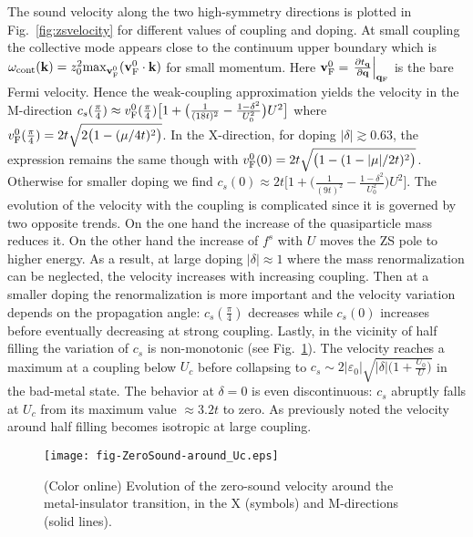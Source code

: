 \documentclass[showpacs,amsmath,twocolumn,floatfix]{revtex4-1}
\begin{document}
The sound velocity along the two high-symmetry directions is plotted in 
Fig.~\ref{fig:zsvelocity} for different values of coupling and doping. At small 
coupling the collective mode appears close to the continuum upper boundary which 
is $\omega_{\rm cont}({\bf k}) = z_0^2 {\rm max}_{{\bf v}_{\rm F}^0} 
({\bf v}_{\rm F}^0 \cdot {\bf k}) $ for small momentum. Here 
${\bf v}_{\rm F}^0 = \left.  \frac{ \partial t_{\bf q}}{ \partial {\bf q}} 
\right|_{{\bf q}_{\rm F}}$ is the bare Fermi velocity. Hence the weak-coupling 
approximation yields the velocity in the M-direction  
 $c_s(\frac{\pi}{4}) \approx v_{\rm F}^0 (\frac{\pi}{4}) \big[1+ \big(\frac{1}{(18 t)^2} 
 - \frac{1-\delta^2}{U_0^2}\big)U^2 \big]$
where $ v_{\rm F}^0 (\frac{\pi}{4}) = 2t\sqrt{2\big(1-({\mu}/{4t})^2\big)}$. In the 
X-direction, for doping $|\delta| \gtrsim 0.63$, the expression remains the same though 
with $v_{\rm F}^0(0) = 2t \sqrt{\big(1-(1-{|\mu|}/{2t})^2\big)}$. Otherwise for smaller 
doping we find $c_s(0) \approx 2 t \big[1+ \big(\frac{1}{(9t)^2} - \frac{1-\delta^2}{U_0^2}
\big)U^2 \big]$. The evolution of the velocity with the coupling is complicated since it 
is governed by two opposite trends. On the one hand the increase of the quasiparticle mass 
reduces it. On the other hand the increase of $f^s$ with $U$ moves the ZS pole to higher 
energy. As a result, at large doping $|\delta| \approx 1$ where the mass renormalization 
can be neglected, the velocity increases with increasing coupling. Then at a smaller 
doping the renormalization is more important and the velocity variation depends on the 
propagation angle: $c_s(\frac{\pi}{4})$ decreases while $c_s(0)$ increases before 
eventually decreasing at strong coupling. Lastly, in the vicinity of half filling the 
variation of $c_s$ is non-monotonic (see Fig.~\ref{fig:zsvelocity-2}). The velocity 
reaches a maximum at a coupling below $U_c$ before collapsing to 
$c_s \sim 2 |\varepsilon_0|\sqrt{|\delta|\big(1+\frac{U_0}{U}\big)}$ in the bad-metal 
state. The behavior at $\delta=0$ is even discontinuous: $c_s$ abruptly falls at $U_c$ 
from its maximum value $\approx 3.2t$ to zero. As previously noted the velocity around 
half filling becomes isotropic at large coupling. 


\begin{figure}[h]
  \texttt{[image: fig-ZeroSound-around\_Uc.eps]}
  \caption{(Color online) Evolution of the zero-sound velocity around the metal-insulator 
  transition, in the X (symbols) and M-directions (solid lines). }
  \label{fig:zsvelocity-2}
\end{figure}
\end{document}
